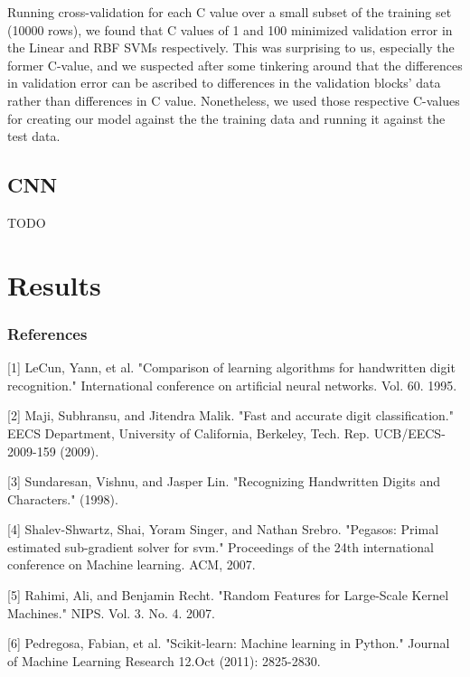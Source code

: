 \documentclass{article} %
\begin{document}
Running cross-validation for each C value over a small subset of
the training set (10000 rows), we found that C values of 1 and 100
minimized validation error in the Linear and RBF SVMs respectively.
This was surprising to us, especially the former C-value, and we
suspected after some tinkering around that the differences in
validation error can be ascribed to differences in the validation
blocks’ data rather than differences in C value. Nonetheless, we
used those respective C-values for creating our model against the
the training data and running it against the test data. 


\subsection{CNN}
TODO

\section{Results}

\subsubsection*{References}

\small{
  [1] LeCun, Yann, et al. "Comparison of learning algorithms for handwritten
  digit recognition." International conference on artificial neural networks.
  Vol. 60. 1995.	

  [2] Maji, Subhransu, and Jitendra Malik. "Fast and accurate digit
  classification." EECS Department, University of California,
  Berkeley, Tech. Rep. UCB/EECS-2009-159 (2009).

  [3] Sundaresan, Vishnu, and Jasper Lin. "Recognizing Handwritten Digits and
  Characters." (1998).

  [4] Shalev-Shwartz, Shai, Yoram Singer, and Nathan Srebro. "Pegasos: Primal
  estimated sub-gradient solver for svm." Proceedings of the 24th international
  conference on Machine learning. ACM, 2007.

  [5] Rahimi, Ali, and Benjamin Recht. "Random Features for Large-Scale Kernel
  Machines." NIPS. Vol. 3. No. 4. 2007.

  [6] Pedregosa, Fabian, et al. "Scikit-learn: Machine learning in Python."
  Journal of Machine Learning Research 12.Oct (2011): 2825-2830.
}
\end{document}
